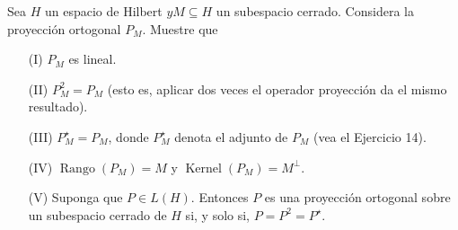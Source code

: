  Sea $H$ un espacio de Hilbert $y M \subseteq H$ un subespacio cerrado. Considera la proyección ortogonal $P_M$. Muestre que
 \begin{itemize}
     \item[(I)] $P_M$ es lineal.
\item[(II)] $P_M^2=P_M$ (esto es, aplicar dos veces el operador proyección da el mismo resultado).
\item[(III)] $P_M^{\star}=P_M$, donde $P_M^{\star}$ denota el adjunto de $P_M$ (vea el Ejercicio 14).
\item[(IV)] $\operatorname{Rango}\left(P_M\right)=M$ y $\operatorname{Kernel}\left(P_M\right)=M^{\perp}$.
\item[(V)] Suponga que $P \in L(H)$. Entonces $P$ es una proyección ortogonal sobre un subespacio cerrado de $H$ si, y solo si, $P=P^2=P^{\star}$. 
 \end{itemize}
